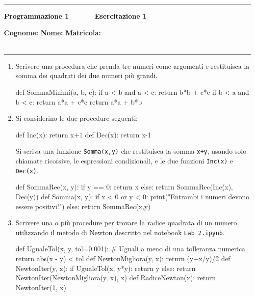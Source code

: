 \documentclass[11pt,a4]{article}
\begin{document}
\thispagestyle{empty}
\hrule
\begin{center}
   {\Large {\bf Programmazione 1 \hspace{3cm} $\quad \quad \quad$ Esercitazione 1}}
\end{center}
{\bf Cognome: }\hspace{2.5cm} {\bf Nome: } \hspace{2.5cm} {\bf Matricola: } \\\
\hrule

\begin{enumerate}
\section*{}

\item Scrivere una procedura che prenda tre numeri come argomenti 
e restituisca la somma dei quadrati dei due numeri più grandi.

\begin{python}
def SommaMinimi(a, b, c):
    if a < b and a < c:
        return b*b + c*c
    if b < a and b < c:
        return a*a + c*c
    return a*a + b*b
\end{python}

\item Si considerino le due procedure seguenti:

\begin{python}
def Inc(x):
    return x+1
def Dec(x):
    return x-1
\end{python}

Si scriva una funzione {\tt Somma(x,y)} che restituisca la somma {\tt x+y},
usando solo chiamate ricorsive, le espressioni condizionali, 
e le due funzioni {\tt Inc(x)} e {\tt Dec(x)}.

\begin{python}
def SommaRec(x, y):
    if y == 0:
        return x
    else:
        return SommaRec(Inc(x), Dec(y))
def Somma(x, y):
    if x < 0 or y < 0:
        print("Entrambi i numeri devono essere positivi!")
    else:
        return SommaRec(x,y)
\end{python}

\item Scrivere una o più procedure per trovare la radice quadrata di un numero, 
utilizzando il metodo di Newton descritto nel notebook {\tt Lab 2.ipynb}.
\begin{python}
def UgualeTol(x, y, tol=0.001):  # Uguali a meno di una tolleranza numerica
    return abs(x - y) < tol
def NewtonMigliora(y, x):
    return (y+x/y)/2
def NewtonIter(y, x):
    if UgualeTol(x, y*y):
        return y
    else:
        return NewtonIter(NewtonMigliora(y, x), x)
def RadiceNewton(x):
    return NewtonIter(1, x)
\end{python}
 

\end{enumerate}
\end{document}
